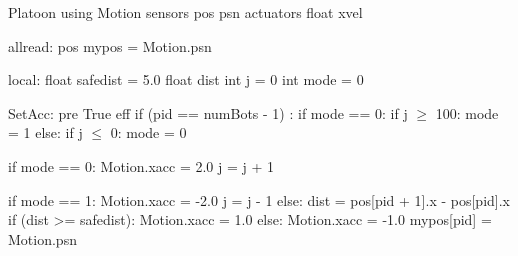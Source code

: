 Platoon
using Motion 
    sensors pos psn
    actuators float xvel
       
allread:
   pos mypos = Motion.psn

local:
   float safedist = 5.0
   float dist 
   int j = 0 
   int mode = 0

SetAcc:
  pre True
  eff
     if (pid == numBots - 1) :
        if mode == 0:
            if j $\geq$ 100:
                 mode = 1
        else:
            if j $\leq$ 0:
                mode = 0
                
        if mode == 0:
            Motion.xacc = 2.0
            j = j + 1
          
        if mode == 1:
            Motion.xacc = -2.0
            j = j - 1
     else:
        dist = pos[pid + 1].x - pos[pid].x
        if (dist >= safedist):
            Motion.xacc = 1.0
        else:
            Motion.xacc = -1.0
    mypos[pid] = Motion.psn

